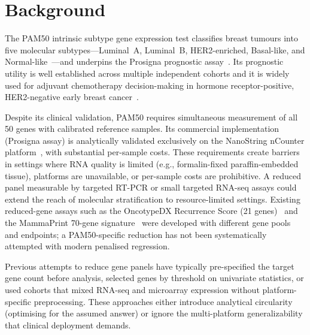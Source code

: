 \documentclass[pdflatex,sn-vancouver-num]{sn-jnl}
\begin{document}

\maketitle

\section{Background}\label{sec:background}

The PAM50 intrinsic subtype gene expression test classifies breast tumours into five molecular subtypes---Luminal~A, Luminal~B, HER2-enriched, Basal-like, and Normal-like~\cite{perou2000,sorlie2001}---and underpins the Prosigna prognostic assay~\cite{parker2009}. Its prognostic utility is well established across multiple independent cohorts and it is widely used for adjuvant chemotherapy decision-making in hormone receptor-positive, HER2-negative early breast cancer~\cite{cardoso2016,sparano2018}.

Despite its clinical validation, PAM50 requires simultaneous measurement of all 50 genes with calibrated reference samples. Its commercial implementation (Prosigna assay) is analytically validated exclusively on the NanoString nCounter platform~\cite{nielsen2014}, with substantial per-sample costs. These requirements create barriers in settings where RNA quality is limited (e.g., formalin-fixed paraffin-embedded tissue), platforms are unavailable, or per-sample costs are prohibitive. A reduced panel measurable by targeted RT-PCR or small targeted RNA-seq assays could extend the reach of molecular stratification to resource-limited settings. Existing reduced-gene assays such as the OncotypeDX Recurrence Score (21 genes)~\cite{paik2004} and the MammaPrint 70-gene signature~\cite{vantveer2002} were developed with different gene pools and endpoints; a PAM50-specific reduction has not been systematically attempted with modern penalised regression.

Previous attempts to reduce gene panels have typically pre-specified the target gene count before analysis, selected genes by threshold on univariate statistics, or used cohorts that mixed RNA-seq and microarray expression without platform-specific preprocessing. These approaches either introduce analytical circularity (optimising for the assumed answer) or ignore the multi-platform generalizability that clinical deployment demands.
\end{document}
